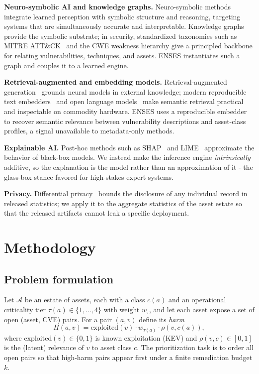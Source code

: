 \documentclass[journal]{IEEEtran}
\begin{document}
\textbf{Neuro-symbolic AI and knowledge graphs.} Neuro-symbolic
methods~\cite{garcez2023neurosymbolic} integrate learned perception with
symbolic structure and reasoning, targeting systems that are simultaneously
accurate and interpretable. Knowledge graphs provide the symbolic substrate;
in security, standardized taxonomies such as MITRE ATT\&CK~\cite{strom2020attack}
and the CWE weakness hierarchy give a principled backbone for relating
vulnerabilities, techniques, and assets. ENSES instantiates such a graph and
couples it to a learned engine.

\textbf{Retrieval-augmented and embedding models.} Retrieval-augmented
generation~\cite{lewis2020rag} grounds neural models in external knowledge;
modern reproducible text embedders~\cite{nussbaum2024nomic} and open language
models~\cite{yang2024qwen2,jiang2023mistral} make semantic retrieval practical
and inspectable on commodity hardware. ENSES uses a reproducible embedder to
recover semantic relevance between vulnerability descriptions and asset-class
profiles, a signal unavailable to metadata-only methods.

\textbf{Explainable AI.} Post-hoc methods such as SHAP~\cite{lundberg2017shap}
and LIME~\cite{ribeiro2016lime} approximate the behavior of black-box models.
We instead make the inference engine \emph{intrinsically} additive, so the
explanation is the model rather than an approximation of it - the
glass-box stance favored for high-stakes expert systems.

\textbf{Privacy.} Differential privacy~\cite{dwork2014dp} bounds the disclosure
of any individual record in released statistics; we apply it to the aggregate
statistics of the asset estate so that the released artifacts cannot leak a
specific deployment.

\section{Methodology}
\label{sec:method}
\subsection{Problem formulation}
Let $\mathcal{A}$ be an estate of assets, each with a class $c(a)$ and an
operational criticality tier $\tau(a)\in\{1,\dots,4\}$ with weight $w_\tau$, and
let each asset expose a set of open (asset, CVE) pairs. For a pair $(a,v)$ define
its \emph{harm}
\begin{equation}
H(a,v) = \mathrm{exploited}(v)\cdot w_{\tau(a)}\cdot \rho(v,c(a)),
\end{equation}
where $\mathrm{exploited}(v)\in\{0,1\}$ is known exploitation (KEV) and
$\rho(v,c)\in[0,1]$ is the (latent) relevance of $v$ to asset class $c$. The
prioritization task is to order all open pairs so that high-harm pairs appear
first under a finite remediation budget $k$.
\end{document}
